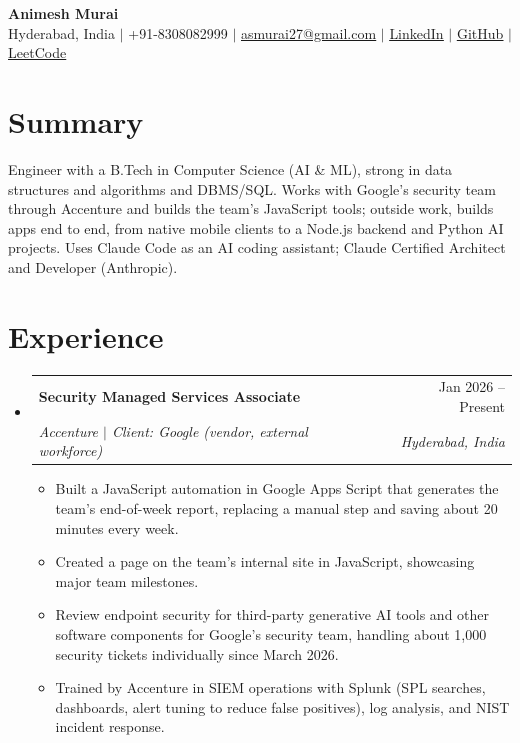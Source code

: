 \documentclass[a4paper,11pt]{article}
\makeatletter
\newcommand{\resumeItem}[1]{\item\small{#1\vspace{-1pt}}}
\newcommand{\resumeSubheading}[4]{
  \vspace{-1pt}\item
    \begin{tabularx}{0.97\textwidth}[t]{@{}>{\raggedright\arraybackslash}X@{\hspace{0.75em}}r@{}}
      \textbf{#1} & #2 \\
      \textit{\small#3} & \textit{\small #4} \\
    \end{tabularx}\vspace{-3pt}
}
\newcommand{\resumeSubItemListStart}{\begin{itemize}[leftmargin=0.15in, label={}]}
\newcommand{\resumeSubItemListEnd}{\end{itemize}}
\newcommand{\resumeItemListStart}{\begin{itemize}[itemsep=2pt]}
\newcommand{\resumeItemListEnd}{\end{itemize}\vspace{-2pt}}
\makeatother
\begin{document}
\begin{center}
    {\Huge\bfseries Animesh Murai} \\ \vspace{4pt}
    \small Hyderabad, India $|$ +91-8308082999 $|$
    \href{mailto:asmurai27@gmail.com}{\underline{asmurai27@gmail.com}} $|$
    \href{https://www.linkedin.com/in/animesh-murai-538384253/}{\underline{LinkedIn}} $|$
    \href{https://github.com/muraias7781}{\underline{GitHub}} $|$
    \href{https://leetcode.com/u/sAMurai7781/}{\underline{LeetCode}}
\end{center}

\section{Summary}
  \small{Engineer with a B.Tech in Computer Science (AI \& ML), strong in data structures and algorithms and DBMS/SQL. Works with Google's security team through Accenture and builds the team's JavaScript tools; outside work, builds apps end to end, from native mobile clients to a Node.js backend and Python AI projects. Uses Claude Code as an AI coding assistant; Claude Certified Architect and Developer (Anthropic).}

\section{Experience}
  \resumeSubItemListStart

    \resumeSubheading
      {Security Managed Services Associate}{Jan 2026 -- Present}
      {Accenture $|$ Client: Google (vendor, external workforce)}{Hyderabad, India}
      \resumeItemListStart
        \resumeItem{Built a JavaScript automation in Google Apps Script that generates the team's end-of-week report, replacing a manual step and saving about 20 minutes every week.}
        \resumeItem{Created a page on the team's internal site in JavaScript, showcasing major team milestones.}
        \resumeItem{Review endpoint security for third-party generative AI tools and other software components for Google's security team, handling about 1,000 security tickets individually since March 2026.}
        \resumeItem{Trained by Accenture in SIEM operations with Splunk (SPL searches, dashboards, alert tuning to reduce false positives), log analysis, and NIST incident response.}
      \resumeItemListEnd

  \resumeSubItemListEnd
\end{document}

